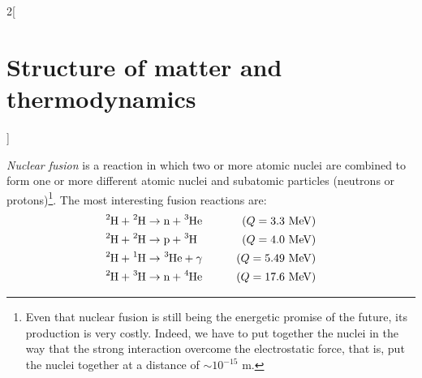 \documentclass[../../../main_physics.tex]{subfiles}
\begin{document}
\begin{multicols}{2}[\section{Structure of matter and thermodynamics}]
\begin{definition}
\begin{enumerate}
\begin{center}
\begin{minipage}{\linewidth}
              \end{minipage}
            \end{center}
    \end{enumerate}
  \end{definition}
  \begin{definition}
    \emph{Nuclear fusion} is a reaction in which two or more atomic nuclei are combined to form one or more different atomic nuclei and subatomic particles (neutrons or protons)\footnote{Even that nuclear fusion is still being the energetic promise of the future, its production is very costly. Indeed, we have to put together the nuclei in the way that the strong interaction overcome the electrostatic force, that is, put the nuclei together at a distance of $\sim 10^{-15}\text{ m}$.}. The most interesting fusion reactions are:
    \begin{align*}
      \ce{^2H}+\ce{^2H} & \rightarrow\text{n}+\ce{^3He}\qquad & (Q=3.3\text{ MeV})  \\
      \ce{^2H}+\ce{^2H} & \rightarrow\text{p}+\ce{^3H}\qquad  & (Q=4.0\text{ MeV})  \\
      \ce{^2H}+\ce{^1H} & \rightarrow\ce{^3He}+\gamma\qquad   & (Q=5.49\text{ MeV}) \\
      \ce{^2H}+\ce{^3H} & \rightarrow\text{n}+\ce{^4He}\qquad & (Q=17.6\text{ MeV})
    \end{align*}
  \end{definition}

\end{multicols}
\end{document}
